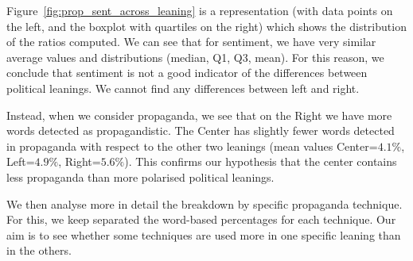Figure~\ref{fig:prop_sent_across_leaning} is a representation (with data points on the left, and the boxplot with quartiles on the right) which shows the distribution of the ratios computed. We can see that for sentiment, we have very similar average values and distributions (median, Q1, Q3, mean).
For this reason, we conclude that sentiment is not a good indicator of the differences between political leanings. We cannot find any differences between left and right.

Instead, when we consider propaganda, we see that on the Right we have more words detected as propagandistic.
The Center has slightly fewer words detected in propaganda with respect to the other two leanings (mean values Center=$4.1\%$, Left=$4.9\%$, Right=$5.6\%$).
This confirms our hypothesis that the center contains less propaganda than more polarised political leanings.





We then analyse more in detail the breakdown by specific propaganda technique. For this, we keep separated the word-based percentages for each technique.
Our aim is to see whether some techniques are used more in one specific leaning than in the others.


